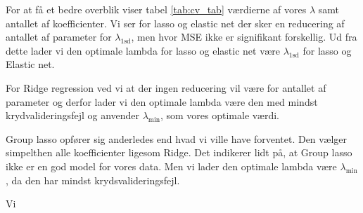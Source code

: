 For at få et bedre overblik viser tabel  \ref{tab:cv_tab} værdierne af vores $\lambda$ samt antallet af koefficienter. 
Vi ser for lasso og elastic net der sker en reducering af antallet af parameter for $\lambda_{1\text{sd}}$, men hvor MSE ikke er signifikant forskellig. Ud fra dette lader vi den optimale lambda for lasso og elastic net være $\lambda_{1\text{sd}}$ for lasso og Elastic net. 

For Ridge regression ved vi at der ingen reducering vil være for antallet af parameter og derfor lader vi den optimale lambda være den med mindst krydvalideringsfejl og anvender $\lambda_{\min}$, som vores optimale værdi. 

Group lasso opfører sig anderledes end hvad vi ville have forventet. Den vælger simpelthen alle koefficienter ligesom Ridge. Det indikerer lidt på, at Group lasso ikke er en god model for vores data. Men vi  lader den optimale lambda være $\lambda_{\min}$, da den har mindst krydsvalideringsfejl. 



Vi




